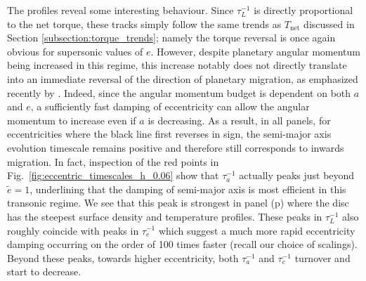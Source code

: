 The profiles reveal some interesting behaviour. Since $\tau_{L}^{-1}$ is directly proportional to the net torque, these tracks simply follow the same trends as $T_\textrm{net}$ discussed in Section \ref{subsection:torque_trends}; namely the torque reversal is once again obvious for supersonic values of $e$. However, despite planetary angular momentum being increased in this regime, this increase notably does not directly translate into an immediate reversal of the direction of planetary migration, as emphasized recently by \cite{IdaEtAl_2020}. Indeed, since the angular momentum budget is dependent on both $a$ and $e$, a sufficiently fast damping of eccentricity can allow the angular momentum to increase even if $a$ is decreasing. As a result, in all panels, for eccentricities where the black line first reverses in sign, the semi-major axis evolution timescale remains positive and therefore still corresponds to inwards migration. In fact, inspection of the red points in Fig.~\ref{fig:eccentric_timescales_h_0.06} show that $\tau_{a}^{-1}$ actually peaks just beyond $\tilde{e} = 1$, underlining that the damping of semi-major axis is most efficient in this transonic regime. We see that this peak is strongest in panel (p) where the disc has the steepest surface density and temperature profiles. These peaks in $\tau_{L}^{-1}$ also roughly coincide with peaks in $\tau_{e}^{-1}$ which suggest a much more rapid eccentricity damping occurring on the order of 100 times faster (recall our choice of scalings). Beyond these peaks, towards higher eccentricity, both $\tau_{a}^{-1}$ and $\tau_{e}^{-1}$ turnover and start to decrease. 

